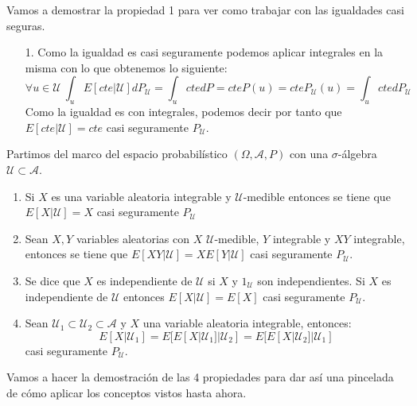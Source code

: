 \begin{demostracion}
	Vamos a demostrar la propiedad 1 para ver como trabajar con las igualdades casi seguras.
	\begin{enumerate}
		\item[1.] Como la igualdad es casi seguramente podemos aplicar integrales en la misma con lo que obtenemos lo siguiente:
		$$\forall u \in \mathcal{U} \ \int_{u} E[cte | \mathcal{U}]dP_{\mathcal{U}} = \int_{u}cte dP = cte P(u) = cte P_{\mathcal{U}}(u) = \int_{u}cte dP_{\mathcal{U}}$$
		Como la igualdad es con integrales, podemos decir por tanto que $E[cte | \mathcal{U}] = cte$ casi seguramente $P_{\mathcal{U}}$.
	\end{enumerate}
\end{demostracion}

\begin{propiedades}
	Partimos del marco del espacio probabilístico $(\Omega , \mathcal{A}, P)$ con una $\sigma$-álgebra $\mathcal{U}\subset \mathcal{A}$.
	\begin{enumerate}
		\item Si $X$ es una variable aleatoria integrable y $\mathcal{U}$-medible entonces se tiene que $E[X | \mathcal{U}] = X$ casi seguramente $P_{\mathcal{U}}$
		\item Sean $X, Y$ variables aleatorias con $X$ $\mathcal{U}$-medible, $Y$ integrable y $XY$ integrable, entonces se tiene que $E[XY | \mathcal{U}] = XE[Y | \mathcal{U}]$ casi seguramente $P_{\mathcal{U}}$.
		\item Se dice que $X$ es independiente de $\mathcal{U}$ si $X$ y $1_{\mathcal{U}}$ son independientes. Si $X$ es independiente de $\mathcal{U}$ entonces $E[X | \mathcal{U}] = E[X]$ casi seguramente $P_{\mathcal{U}}$.
		\item Sean $\mathcal{U}_1 \subset \mathcal{U}_2 \subset \mathcal{A}$ y $X$ una variable aleatoria integrable, entonces:
		$$E[X | \mathcal{U}_1] = E[E[X | \mathcal{U}_1] | \mathcal{U}_2] = E[E[X | \mathcal{U}_2] | \mathcal{U}_1]$$ casi seguramente $P_{\mathcal{U}}$.
	\end{enumerate}
\end{propiedades}

Vamos a hacer la demostración de las 4 propiedades para dar así una pincelada de cómo aplicar los conceptos vistos hasta ahora.

